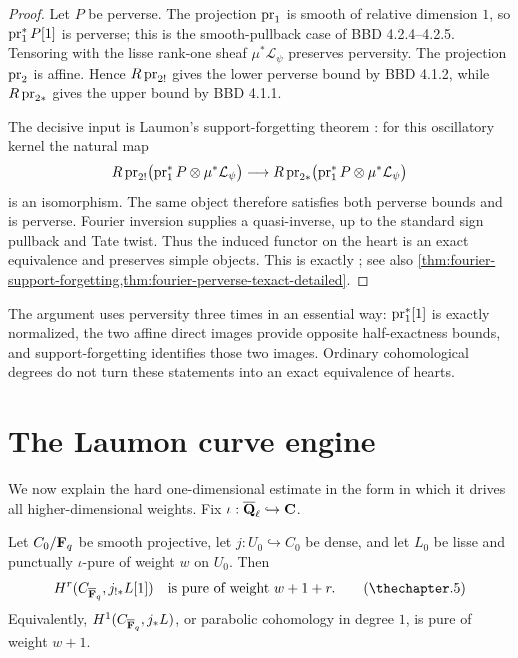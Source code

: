 \begin{proof}
Let \(P\) be perverse.  The projection \(\operatorname{pr}_1\) is smooth of relative
dimension \(1\), so \(\operatorname{pr}_1^*P[1]\) is perverse; this is the smooth-pullback
case of BBD 4.2.4--4.2.5.  Tensoring with the lisse rank-one sheaf
\(\mu^*\mathcal L_\psi\) preserves perversity.  The projection \(\operatorname{pr}_2\) is
affine.  Hence \(R\operatorname{pr}_{2!}\) gives the lower perverse bound by BBD 4.1.2,
while \(R\operatorname{pr}_{2*}\) gives the upper bound by BBD 4.1.1.

The decisive input is Laumon's support-forgetting theorem
\cite[Thm.~1.3.1.1]{LaumonFourier}: for this oscillatory kernel the natural
map
\[
 R\operatorname{pr}_{2!}\bigl(\operatorname{pr}_1^*P\otimes\mu^*\mathcal L_\psi\bigr)
 \longrightarrow
 R\operatorname{pr}_{2*}\bigl(\operatorname{pr}_1^*P\otimes\mu^*\mathcal L_\psi\bigr)
\]
is an isomorphism.  The same object therefore satisfies both perverse
bounds and is perverse.  Fourier inversion supplies a quasi-inverse, up to
the standard sign pullback and Tate twist.  Thus the induced functor on the
heart is an exact equivalence and preserves simple objects.  This is exactly
\cite[Thm.~1.3.2.3 and Cor.~1.3.2.4]{LaumonFourier}; see also
\cref{thm:fourier-support-forgetting,thm:fourier-perverse-texact-detailed}.
\end{proof}

\begin{powerbox}
The argument uses perversity three times in an essential way:
\(\operatorname{pr}_1^*[1]\) is exactly normalized, the two affine direct images provide
opposite half-exactness bounds, and support-forgetting identifies those two
images.  Ordinary cohomological degrees do not turn these statements into an
exact equivalence of hearts.
\end{powerbox}

\section{The Laumon curve engine}

We now explain the hard one-dimensional estimate in the form in which it
drives all higher-dimensional weights.  Fix
\(\iota:\overline{\mathbf Q}_\ell\hookrightarrow\mathbf C\).

\begin{theorem}
\label{thm:laumon-curve-engine}
Let \(C_0/\mathbf F_q\) be smooth projective, let \(j:U_0\hookrightarrow C_0\) be
dense, and let \(L_0\) be lisse and punctually \(\iota\)-pure of weight
\(w\) on \(U_0\).  Then
\[
  H^r(C_{\Fbar},j_{!*}L[1])
  \quad\text{is pure of weight }w+1+r.
\tag{\thechapter.5}\label{eq:curve-ic-purity-engine}
\]
Equivalently, \(H^1(C_{\overline{\mathbf F}_q},j_*L)\), or parabolic cohomology in degree
\(1\), is pure of weight \(w+1\).
\end{theorem}

